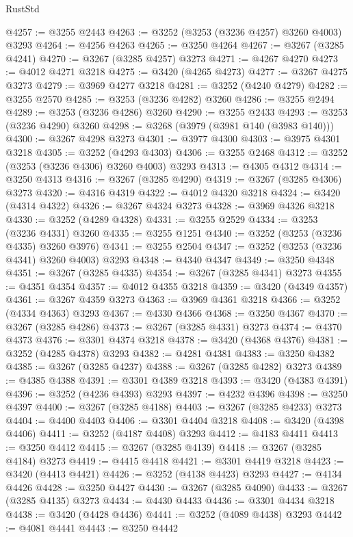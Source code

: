 \begin{lexlean}{RustStd}
\begin{coremodule}
{\begin{coremodule}
{{{{{{{{{{{{{{{{{{{{{{{{{{{{{{{{{{{{{{{@4257 := @3255 @2443
@4263 := @3252 (@3253 (@3236 @4257) @3260 @4003) @3293
@4264 := @4256 @4263
@4265 := @3250 @4264
@4267 := @3267 (@3285 @4241)
@4270 := @3267 (@3285 @4257) @3273
@4271 := @4267 @4270
@4273 := @4012 @4271 @3218
@4275 := @3420 (@4265 @4273)
@4277 := @3267 @4275 @3273
@4279 := @3969 @4277 @3218
@4281 := @3252 (@4240 @4279)
@4282 := @3255 @2570
@4285 := @3253 (@3236 @4282) @3260
@4286 := @3255 @2494
@4289 := @3253 (@3236 @4286) @3260
@4290 := @3255 @2433
@4293 := @3253 (@3236 @4290) @3260
@4298 := @3268 (@3979 (@3981 @140 (@3983 @140)))
@4300 := @3267 @4298 @3273
@4301 := @3977 @4300
@4303 := @3975 @4301 @3218
@4305 := @3252 (@4293 @4303)
@4306 := @3255 @2468
@4312 := @3252 (@3253 (@3236 @4306) @3260 @4003) @3293
@4313 := @4305 @4312
@4314 := @3250 @4313
@4316 := @3267 (@3285 @4290)
@4319 := @3267 (@3285 @4306) @3273
@4320 := @4316 @4319
@4322 := @4012 @4320 @3218
@4324 := @3420 (@4314 @4322)
@4326 := @3267 @4324 @3273
@4328 := @3969 @4326 @3218
@4330 := @3252 (@4289 @4328)
@4331 := @3255 @2529
@4334 := @3253 (@3236 @4331) @3260
@4335 := @3255 @1251
@4340 := @3252 (@3253 (@3236 @4335) @3260 @3976)
@4341 := @3255 @2504
@4347 := @3252 (@3253 (@3236 @4341) @3260 @4003) @3293
@4348 := @4340 @4347
@4349 := @3250 @4348
@4351 := @3267 (@3285 @4335)
@4354 := @3267 (@3285 @4341) @3273
@4355 := @4351 @4354
@4357 := @4012 @4355 @3218
@4359 := @3420 (@4349 @4357)
@4361 := @3267 @4359 @3273
@4363 := @3969 @4361 @3218
@4366 := @3252 (@4334 @4363) @3293
@4367 := @4330 @4366
@4368 := @3250 @4367
@4370 := @3267 (@3285 @4286)
@4373 := @3267 (@3285 @4331) @3273
@4374 := @4370 @4373
@4376 := @3301 @4374 @3218
@4378 := @3420 (@4368 @4376)
@4381 := @3252 (@4285 @4378) @3293
@4382 := @4281 @4381
@4383 := @3250 @4382
@4385 := @3267 (@3285 @4237)
@4388 := @3267 (@3285 @4282) @3273
@4389 := @4385 @4388
@4391 := @3301 @4389 @3218
@4393 := @3420 (@4383 @4391)
@4396 := @3252 (@4236 @4393) @3293
@4397 := @4232 @4396
@4398 := @3250 @4397
@4400 := @3267 (@3285 @4188)
@4403 := @3267 (@3285 @4233) @3273
@4404 := @4400 @4403
@4406 := @3301 @4404 @3218
@4408 := @3420 (@4398 @4406)
@4411 := @3252 (@4187 @4408) @3293
@4412 := @4183 @4411
@4413 := @3250 @4412
@4415 := @3267 (@3285 @4139)
@4418 := @3267 (@3285 @4184) @3273
@4419 := @4415 @4418
@4421 := @3301 @4419 @3218
@4423 := @3420 (@4413 @4421)
@4426 := @3252 (@4138 @4423) @3293
@4427 := @4134 @4426
@4428 := @3250 @4427
@4430 := @3267 (@3285 @4090)
@4433 := @3267 (@3285 @4135) @3273
@4434 := @4430 @4433
@4436 := @3301 @4434 @3218
@4438 := @3420 (@4428 @4436)
@4441 := @3252 (@4089 @4438) @3293
@4442 := @4081 @4441
@4443 := @3250 @4442
}}}}}}}}}}}}}}}}}}}}}}}}}}}}}}}}}}}}}}}
\end{coremodule}}
\end{coremodule}
\end{lexlean}
